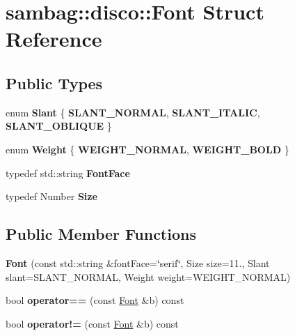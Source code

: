 \hypertarget{structsambag_1_1disco_1_1_font}{
\section{sambag::disco::Font Struct Reference}
\label{structsambag_1_1disco_1_1_font}
}
\subsection*{Public Types}
\begin{DoxyCompactItemize}
\item 
enum {\bfseries Slant} \{ {\bfseries SLANT\_\-NORMAL}, 
{\bfseries SLANT\_\-ITALIC}, 
{\bfseries SLANT\_\-OBLIQUE}
 \}
\item 
enum {\bfseries Weight} \{ {\bfseries WEIGHT\_\-NORMAL}, 
{\bfseries WEIGHT\_\-BOLD}
 \}
\item 
\hypertarget{structsambag_1_1disco_1_1_font_a25660acc9cf6e13c39fcf3c0f5dff2d3}{
typedef std::string {\bfseries FontFace}}
\label{structsambag_1_1disco_1_1_font_a25660acc9cf6e13c39fcf3c0f5dff2d3}

\item 
\hypertarget{structsambag_1_1disco_1_1_font_ab0c00cd26021fec406ea15771569e921}{
typedef Number {\bfseries Size}}
\label{structsambag_1_1disco_1_1_font_ab0c00cd26021fec406ea15771569e921}

\end{DoxyCompactItemize}
\subsection*{Public Member Functions}
\begin{DoxyCompactItemize}
\item 
\hypertarget{structsambag_1_1disco_1_1_font_aab7104a26401b962d344908a90de2108}{
{\bfseries Font} (const std::string \&fontFace=\char`\"{}serif\char`\"{}, Size size=11., Slant slant=SLANT\_\-NORMAL, Weight weight=WEIGHT\_\-NORMAL)}
\label{structsambag_1_1disco_1_1_font_aab7104a26401b962d344908a90de2108}

\item 
\hypertarget{structsambag_1_1disco_1_1_font_a324ebd0cf1c09a1ca0718fa2a39ddbd1}{
bool {\bfseries operator==} (const \hyperlink{structsambag_1_1disco_1_1_font}{Font} \&b) const }
\label{structsambag_1_1disco_1_1_font_a324ebd0cf1c09a1ca0718fa2a39ddbd1}

\item 
\hypertarget{structsambag_1_1disco_1_1_font_a4792b2676588f6385795a4cf0f0870d3}{
bool {\bfseries operator!=} (const \hyperlink{structsambag_1_1disco_1_1_font}{Font} \&b) const }
\label{structsambag_1_1disco_1_1_font_a4792b2676588f6385795a4cf0f0870d3}

\end{DoxyCompactItemize}
